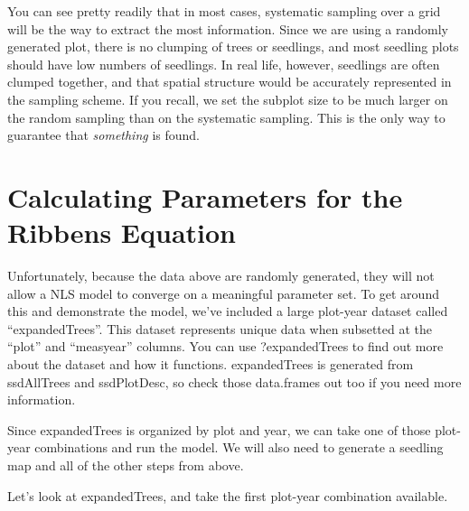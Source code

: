 \documentclass{article}
\begin{document}
You can see pretty readily that in most cases, systematic sampling over a grid will be the way to extract the most information. Since we are using a randomly generated plot, there is no clumping of trees or seedlings, and most seedling plots should have low numbers of seedlings. In real life, however, seedlings are often clumped together, and that spatial structure would be accurately represented in the sampling scheme. If you recall, we set the subplot size to be much larger on the random sampling than on the systematic sampling. This is the only way to guarantee that \textit{something} is found.

\section{Calculating Parameters for the Ribbens Equation}

Unfortunately, because the data above are randomly generated, they will not allow a NLS model to converge on a meaningful parameter set. To get around this and demonstrate the model, we've included a large plot-year dataset called ``expandedTrees''.  This dataset represents unique data when subsetted at the ``plot'' and ``measyear'' columns. You can use ?expandedTrees to find out more about the dataset and how it functions. expandedTrees is generated from ssdAllTrees and ssdPlotDesc, so check those data.frames out too if you need more information.

Since expandedTrees is organized by plot and year, we can take one of those plot-year combinations and run the model. We will also need to generate a seedling map and all of the other steps from above.

Let's look at expandedTrees, and take the first plot-year combination available.
\end{document}
